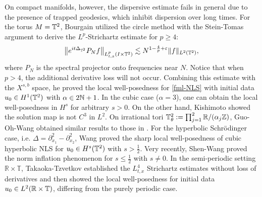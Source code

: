 \documentclass[11pt, reqno]{amsart}
\numberwithin{equation}{section}
\newcommand{\R}{\Bbb R}
\theoremstyle{definition}
\theoremstyle{remark}
\begin{document}
On compact manifolds, however, the dispersive estimate fails in general due to the presence of trapped geodesics, which inhibit dispersion over long times. For the  torus $M=\Bbb T^2$, Bourgain \cite{Bour} utilized the circle method with the  Stein-Tomas argument to derive the $L^p$-Strichartz estimate for $p \geq 4$:
\begin{align}\label{tori}
\big\|e^{it\Delta_{\Bbb T^2}}P_Nf\big\|_{L_{t,x}^p(I\times\Bbb T^2)}\lesssim N^{1-\frac{4}{p}+\varepsilon}\|f\|_{L^2(\Bbb T^2)},
\end{align}
where   $P_N$ is the spectral projector onto  frequencies near $N$. Notice that when $p>4$, the additional derivative loss will not occur.  Combining this estimate with the $X^{s,b}$ space, he proved the local well-posedness for \eqref{fml-NLS} with initial data $u_0\in H^1(\Bbb T^2)$ with $\alpha\in2\Bbb N+1$. In the cubic case ($\alpha=3$), one can obtain the local well-posedness in $H^s$ for arbitrary $s>0$. On the other hand,  Kishimoto \cite{Kishimoto} showed the solution map is not $C^3$ in $L^2$. On irrational tori  $\Bbb T_\theta^2:=\prod_{j=1}^2\R/(\alpha_j\Bbb Z)$, Guo-Oh-Wang \cite{GTW} obtained similar results to those in \cite{Bour}. For the hyperbolic Schr\"odinger case, i.e. $\Delta=\partial_{x_1}^2-\partial_{x_2}^2$, Wang \cite{Wang2} proved the sharp local well-posedness of cubic hyperbolic NLS for $u_0\in H^s(\Bbb T^2)$ with $s>\frac{1}{2}$. Very recently, Shen-Wang \cite{Shen} proved the norm inflation phenomenon for $s\leq\frac12$ with $s\neq0$. In the semi-periodic setting $\mathbb{R} \times \mathbb{T}$, Takaoka-Tzvetkov \cite{TT} established the $L_{t,x}^4$ Strichartz estimates without loss of derivatives and then showed the  local well-posedness for initial data $u_0\in L^2(\R\times\Bbb T)$, differing from the purely periodic case.
	
\end{document}
